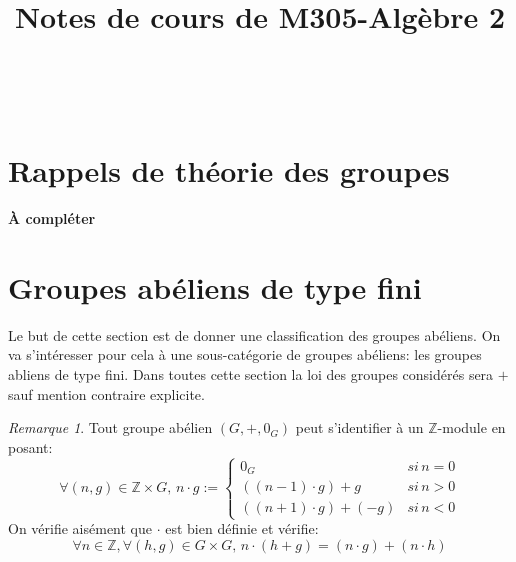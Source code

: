 \documentclass{article}
\newcommand{\Z}{\mathbb{Z}}
\theoremstyle{definition}
\theoremstyle{remark}
\newtheorem{rem}{Remarque}
\begin{document}
\title{Notes de cours de M305-Alg\`ebre 2}

\makeatletter
\begin{titlepage}
    \vspace*{\fill}
    \begin{center}
      {\Huge \@title}\\[0.5cm]
      {\Large \@date}
    \end{center}
    \vspace*{\fill}
\end{titlepage}
\makeatother

\newpage

\tableofcontents

\newpage


\section{Rappels de th\'eorie des groupes}

{\bf\`A compl\'eter}

\section{Groupes ab\'eliens de type fini}

Le but de cette section est de donner une classification des groupes ab\'eliens. On va s'int\'eresser pour cela \`a une sous-cat\'egorie de groupes ab\'eliens: les groupes abliens de type fini. Dans toutes cette section la loi des groupes consid\'er\'es sera $+$ sauf mention contraire explicite.



\begin{rem}
Tout groupe ab\'elien $(G,+,0_G)$ peut s'identifier \`a un $\Z$-module en posant:
$$\forall (n,g)\in\Z\times G,\, n\cdot g:=\begin{cases}0_G & si\, n=0\\ ((n-1)\cdot g)+g & si\, n>0\\((n+1)\cdot g) + (-g) & si\, n<0\end{cases}$$
On v\'erifie ais\'ement que $\cdot$ est bien d\'efinie et v\'erifie:\\
$$\forall n\in \Z,\forall (h,g)\in G\times G,\, n\cdot(h+g)=(n\cdot g)+(n\cdot h)$$
\end{rem}
\end{document}
